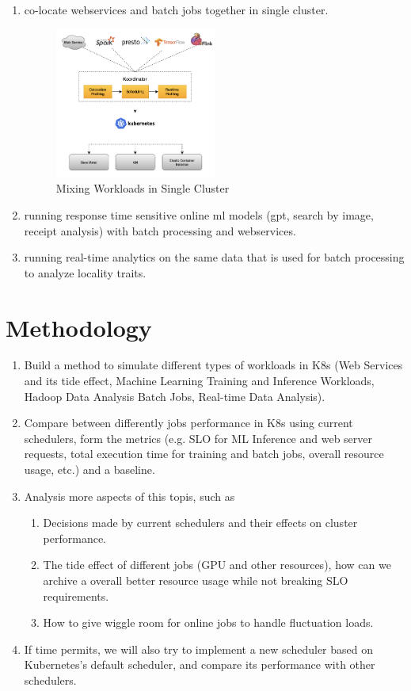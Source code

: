 \documentclass[pdftex,twocolumn,10pt,letterpaper]{article}
\begin{document}
\begin{enumerate}
	\item co-locate webservices and batch jobs together in single cluster.
	      \begin{figure}[h]
		      \centering
		      \includegraphics[width=0.5\textwidth]{fig/koo-arch.png}
		      \caption{Mixing Workloads in Single Cluster \cite{koo}}
	      \end{figure}
	\item running response time sensitive online ml models (gpt, search by image, receipt analysis) with batch processing and webservices.
	\item running real-time analytics on the same data that is used for batch processing to analyze locality traits.
\end{enumerate}

\section*{Methodology}

\begin{enumerate}
	\item Build a method to simulate different types of workloads in K8s (Web Services and its tide effect, Machine Learning Training and Inference Workloads, Hadoop Data Analysis Batch Jobs, Real-time Data Analysis).
	\item Compare between differently jobs performance in K8s using current schedulers, form the metrics (e.g. SLO for ML Inference and web server requests, total execution time for training and batch jobs, overall resource usage, etc.) and a baseline.
	\item Analysis more aspects of this topis, such as
	      \begin{enumerate}
		      \item Decisions made by current schedulers and their effects on cluster performance.
		      \item The tide effect of different jobs (GPU and other resources), how can we archive a overall better resource usage while not breaking SLO requirements.
		      \item How to give wiggle room for online jobs to handle fluctuation loads.
	      \end{enumerate}
	\item If time permits, we will also try to implement a new scheduler based on Kubernetes's default scheduler, and compare its performance with other schedulers.
\end{enumerate}
\end{document}
